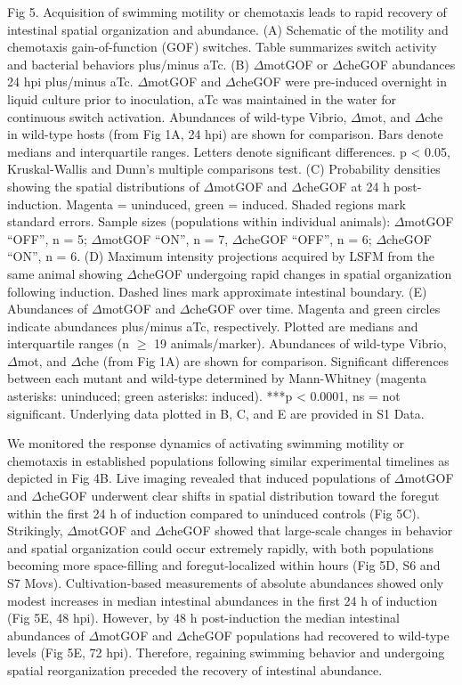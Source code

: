 Fig 5. Acquisition of swimming motility or chemotaxis leads to rapid recovery of intestinal spatial organization and abundance.
(A) Schematic of the motility and chemotaxis gain-of-function (GOF) switches. Table summarizes switch activity and bacterial behaviors plus/minus aTc. (B) $\Delta$motGOF or $\Delta$cheGOF abundances 24 hpi plus/minus aTc. $\Delta$motGOF and $\Delta$cheGOF were pre-induced overnight in liquid culture prior to inoculation, aTc was maintained in the water for continuous switch activation. Abundances of wild-type Vibrio, $\Delta$mot, and $\Delta$che in wild-type hosts (from Fig 1A, 24 hpi) are shown for comparison. Bars denote medians and interquartile ranges. Letters denote significant differences. p < 0.05, Kruskal-Wallis and Dunn's multiple comparisons test. (C) Probability densities showing the spatial distributions of $\Delta$motGOF and $\Delta$cheGOF at 24 h post-induction. Magenta = uninduced, green = induced. Shaded regions mark standard errors. Sample sizes (populations within individual animals): $\Delta$motGOF ``OFF'', n = 5; $\Delta$motGOF ``ON'', n = 7, $\Delta$cheGOF ``OFF'', n = 6; $\Delta$cheGOF ``ON'', n = 6. (D) Maximum intensity projections acquired by LSFM from the same animal showing $\Delta$cheGOF undergoing rapid changes in spatial organization following induction. Dashed lines mark approximate intestinal boundary. (E) Abundances of $\Delta$motGOF and $\Delta$cheGOF over time. Magenta and green circles indicate abundances plus/minus aTc, respectively. Plotted are medians and interquartile ranges (n $\ge$ 19 animals/marker). Abundances of wild-type Vibrio, $\Delta$mot, and $\Delta$che (from Fig 1A) are shown for comparison. Significant differences between each mutant and wild-type determined by Mann-Whitney (magenta asterisks: uninduced; green asterisks: induced). ***p < 0.0001, ns = not significant. Underlying data plotted in B, C, and E are provided in S1 Data.

We monitored the response dynamics of activating swimming motility or chemotaxis in established populations following similar experimental timelines as depicted in Fig 4B. Live imaging revealed that induced populations of $\Delta$motGOF and $\Delta$cheGOF underwent clear shifts in spatial distribution toward the foregut within the first 24 h of induction compared to uninduced controls (Fig 5C). Strikingly, $\Delta$motGOF and $\Delta$cheGOF showed that large-scale changes in behavior and spatial organization could occur extremely rapidly, with both populations becoming more space-filling and foregut-localized within hours (Fig 5D, S6 and S7 Movs). Cultivation-based measurements of absolute abundances showed only modest increases in median intestinal abundances in the first 24 h of induction (Fig 5E, 48 hpi). However, by 48 h post-induction the median intestinal abundances of $\Delta$motGOF and $\Delta$cheGOF populations had recovered to wild-type levels (Fig 5E, 72 hpi). Therefore, regaining swimming behavior and undergoing spatial reorganization preceded the recovery of intestinal abundance. 


